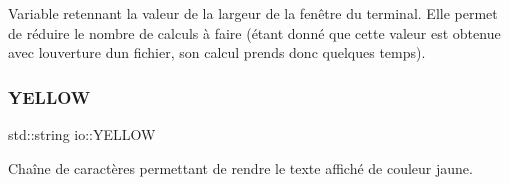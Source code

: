 Variable retennant la valeur de la largeur de la fenêtre du terminal. Elle permet de réduire le nombre de calculs à faire (étant donné que cette valeur est obtenue avec l\textquotesingle{}ouverture d\textquotesingle{}un fichier, son calcul prends donc quelques temps). 

\mbox{\label{namespaceio_a0bb7c89e9e48840601811e4e35421767}} 
\subsubsection{\texorpdfstring{Y\+E\+L\+L\+OW}{YELLOW}}
{\footnotesize\ttfamily std\+::string io\+::\+Y\+E\+L\+L\+OW}



Chaîne de caractères permettant de rendre le texte affiché de couleur jaune. 

